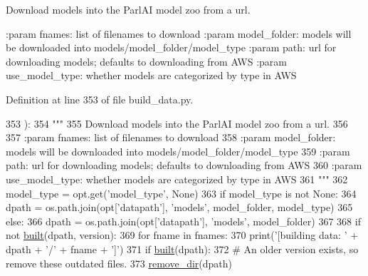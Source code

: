 \begin{DoxyVerb}Download models into the ParlAI model zoo from a url.

:param fnames: list of filenames to download
:param model_folder: models will be downloaded into models/model_folder/model_type
:param path: url for downloading models; defaults to downloading from AWS
:param use_model_type: whether models are categorized by type in AWS
\end{DoxyVerb}
 

Definition at line 353 of file build\+\_\+data.\+py.


\begin{DoxyCode}
353 ):
354     \textcolor{stringliteral}{"""}
355 \textcolor{stringliteral}{    Download models into the ParlAI model zoo from a url.}
356 \textcolor{stringliteral}{}
357 \textcolor{stringliteral}{    :param fnames: list of filenames to download}
358 \textcolor{stringliteral}{    :param model\_folder: models will be downloaded into models/model\_folder/model\_type}
359 \textcolor{stringliteral}{    :param path: url for downloading models; defaults to downloading from AWS}
360 \textcolor{stringliteral}{    :param use\_model\_type: whether models are categorized by type in AWS}
361 \textcolor{stringliteral}{    """}
362     model\_type = opt.get(\textcolor{stringliteral}{'model\_type'}, \textcolor{keywordtype}{None})
363     \textcolor{keywordflow}{if} model\_type \textcolor{keywordflow}{is} \textcolor{keywordflow}{not} \textcolor{keywordtype}{None}:
364         dpath = os.path.join(opt[\textcolor{stringliteral}{'datapath'}], \textcolor{stringliteral}{'models'}, model\_folder, model\_type)
365     \textcolor{keywordflow}{else}:
366         dpath = os.path.join(opt[\textcolor{stringliteral}{'datapath'}], \textcolor{stringliteral}{'models'}, model\_folder)
367 
368     \textcolor{keywordflow}{if} \textcolor{keywordflow}{not} \hyperlink{namespaceparlai_1_1core_1_1build__data_ad834e1a9be02e18a6c2de2b03b9a8f10}{built}(dpath, version):
369         \textcolor{keywordflow}{for} fname \textcolor{keywordflow}{in} fnames:
370             print(\textcolor{stringliteral}{'[building data: '} + dpath + \textcolor{stringliteral}{'/'} + fname + \textcolor{stringliteral}{']'})
371         \textcolor{keywordflow}{if} \hyperlink{namespaceparlai_1_1core_1_1build__data_ad834e1a9be02e18a6c2de2b03b9a8f10}{built}(dpath):
372             \textcolor{comment}{# An older version exists, so remove these outdated files.}
373             \hyperlink{namespaceparlai_1_1core_1_1build__data_a24ab3b7e68e41adf774df058d330ff33}{remove\_dir}(dpath)

\end{DoxyCode}
